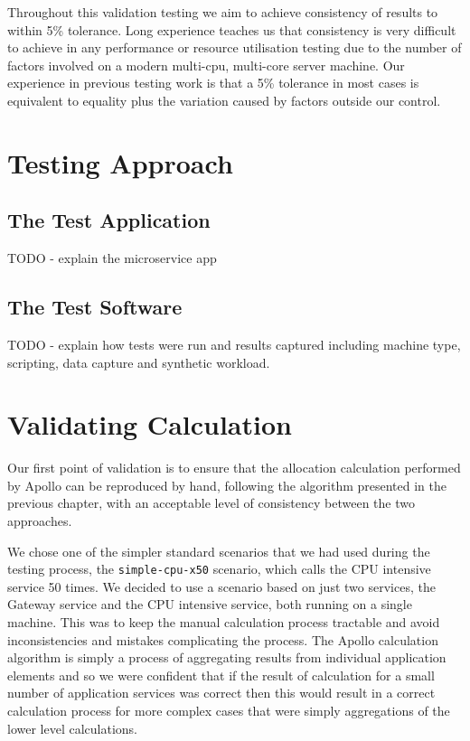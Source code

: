 Throughout this validation testing we aim to achieve consistency of results to within 5\% tolerance.  Long experience teaches us that consistency is very difficult to achieve in any performance or resource utilisation testing due to the number of factors involved on a modern multi-cpu, multi-core server machine.  Our experience in previous testing work is that a 5\% tolerance in most cases is equivalent to equality plus the variation caused by factors outside our control.

\section{Testing Approach}

\subsection{The Test Application}
TODO - explain the microservice app

\subsection{The Test Software}
TODO - explain how tests were run and results captured including machine type, scripting, data capture and synthetic workload.

\section{Validating Calculation}

Our first point of validation is to ensure that the allocation calculation performed by Apollo can be reproduced by hand, following the algorithm presented in the previous chapter, with an acceptable level of consistency between the two approaches.

We chose one of the simpler standard scenarios that we had used during the testing process, the \texttt{simple-cpu-x50} scenario, which calls the CPU intensive service 50 times.  We decided to use a scenario based on just two services, the Gateway service and the CPU intensive service, both running on a single machine.  This was to keep the manual calculation process tractable and avoid inconsistencies and mistakes complicating the process.  The Apollo calculation algorithm is simply a process of aggregating results from individual application elements and so we were confident that if the result of calculation for a small number of application services was correct then this would result in a correct calculation process for more complex cases that were simply aggregations of the lower level calculations.


